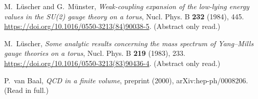 
M.~L\"uscher and G.~M\"unster, \emph{Weak-coupling expansion of the low-lying energy values in the SU(2) gauge theory on a torus},
Nucl. Phys. B \textbf{232} (1984), 445.
\url{https://doi.org/10.1016/0550-3213(84)90038-5}. (Abstract only read.)

M.~L\"uscher, \emph{Some analytic results concerning the mass spectrum of Yang--Mills gauge theories on a torus},
Nucl. Phys. B \textbf{219} (1983), 233.
\url{https://doi.org/10.1016/0550-3213(83)90436-4}. (Abstract only read.)

P.~van Baal, \emph{QCD in a finite volume}, preprint (2000), arXiv:hep-ph/0008206. (Read in full.)
